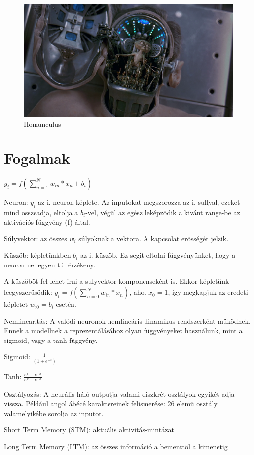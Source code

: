 \documentclass{article}
\begin{document}
\begin{figure}[h!]
\centering
\includegraphics[width=\textwidth,height=\textheight,keepaspectratio]{homunculus.png}
\caption{Homunculus}
\label{fig:homunculus}
\end{figure}

\section{Fogalmak}
$y_i = f(\sum_{n=1}^N w_{in}*x_n + b_i)$ \newline

Neuron: $y_i$ az i. neuron képlete. Az inputokat megszorozza az i. sullyal, ezeket mind osszeadja, eltolja a $b_i$-vel, végül az egész leképzödik a kivánt range-be az aktivációs függvény (f) által. \newline

Súlyvektor: az összes $w_i$ súlyoknak a vektora. A kapcsolat erösségét jelzik. \newline

Küszöb: képletünkben $b_i$ az i. küszöb. Ez segit eltolni függvényünket, hogy a neuron ne legyen túl érzékeny. \newline

A küszöböt fel lehet irni a sulyvektor komponenseként is. Ekkor képletünk leegyszerüsödik: $y_i = f(\sum_{n=0}^N w_{in}*x_n)$, ahol $x_0 = 1$, igy megkapjuk az eredeti képletet $w_{i0} = b_i$ esetén. \newline

Nemlinearitás: A valódi neuronok nemlineáris dinamikus rendszerként müködnek. Ennek a modellnek a reprezentálásához olyan függvényeket használunk, mint a sigmoid, vagy a tanh függvény. \newline

Sigmoid: $\frac{1}{(1+e^{-t})}$ \newline

Tanh: $\frac{e^x-e^{-x}}{e^x+e^{-x}}$ \newline

Osztályozás: A neurális háló outputja valami diszkrét osztályok egyikét adja vissza. Például angol ábécé karaktereinek felismerése: 26 elemü osztály valamelyikébe sorolja az inputot. \newline

Short Term Memory (STM): aktuális aktivitás-mintázat \newline

Long Term Memory (LTM): az összes információ a bementtöl a kimenetig \newline
\end{document}
